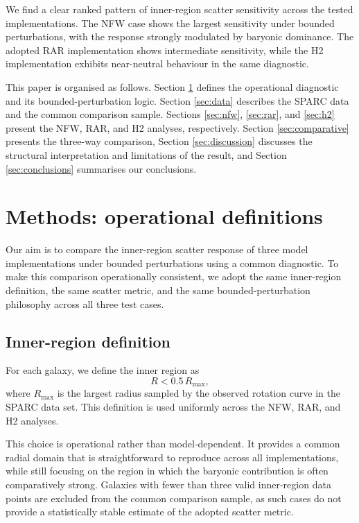 \documentclass[fleqn,usenatbib]{mnras}
\begin{document}
We find a clear ranked pattern of inner-region scatter sensitivity 
across the tested implementations. The NFW case shows the largest 
sensitivity under bounded perturbations, with the response strongly 
modulated by baryonic dominance. The adopted RAR implementation 
shows intermediate sensitivity, while the H2 implementation exhibits 
near-neutral behaviour in the same diagnostic.

This paper is organised as follows. Section \ref{sec:methods} 
defines the operational diagnostic and its bounded-perturbation 
logic. Section \ref{sec:data} describes the SPARC data and the 
common comparison sample. Sections \ref{sec:nfw}, \ref{sec:rar}, 
and \ref{sec:h2} present the NFW, RAR, and H2 analyses, 
respectively. Section \ref{sec:comparative} presents the three-way 
comparison, Section \ref{sec:discussion} discusses the structural 
interpretation and limitations of the result, and Section 
\ref{sec:conclusions} summarises our conclusions.

\section{Methods: operational definitions}
\label{sec:methods}

Our aim is to compare the inner-region scatter response of three model
implementations under bounded perturbations using a common diagnostic.
To make this comparison operationally consistent, we adopt the same
inner-region definition, the same scatter metric, and the same
bounded-perturbation philosophy across all three test cases.

\subsection{Inner-region definition}
\label{subsec:inner_region}

For each galaxy, we define the inner region as
\begin{equation}
	R < 0.5\,R_{\max},
\end{equation}
where $R_{\max}$ is the largest radius sampled by the observed rotation
curve in the SPARC data set. This definition is used uniformly across
the NFW, RAR, and H2 analyses.

This choice is operational rather than model-dependent. It provides a
common radial domain that is straightforward to reproduce across all
implementations, while still focusing on the region in which the
baryonic contribution is often comparatively strong. Galaxies with
fewer than three valid inner-region data points are excluded from the
common comparison sample, as such cases do not provide a statistically
stable estimate of the adopted scatter metric.
\end{document}
